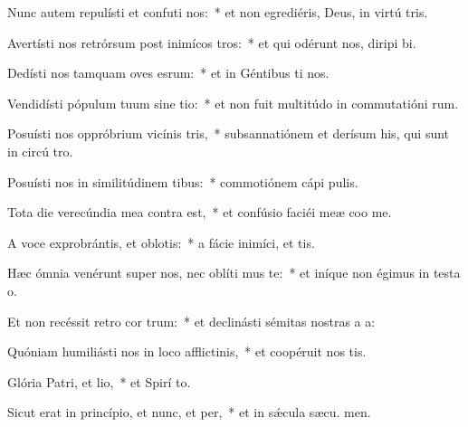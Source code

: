 \item Nunc autem repulísti et confuti nos:~* et non egrediéris, Deus, in virtú tris.
\item Avertísti nos retrórsum post inimícos tros:~* et qui odérunt nos, diripi bi.
\item Dedísti nos tamquam oves esrum:~* et in Géntibus ti nos.
\item Vendidísti pópulum tuum sine tio:~* et non fuit multitúdo in commutatióni rum.
\item Posuísti nos oppróbrium vicínis tris,~* subsannatiónem et derísum his, qui sunt in circú tro.
\item Posuísti nos in similitúdinem tibus:~* commotiónem cápi  pulis.
\item Tota die verecúndia mea contra  est,~* et confúsio faciéi meæ coo me.
\item A voce exprobrántis, et oblotis:~* a fácie inimíci, et tis.
\item Hæc ómnia venérunt super nos, nec oblíti mus te:~* et iníque non égimus in testa o.
\item Et non recéssit retro cor trum:~* et declinásti sémitas nostras a  a:
\item Quóniam humiliásti nos in loco afflictinis,~* et coopéruit nos  tis.
\item Glória Patri, et lio,~* et Spirí to.
\item Sicut erat in princípio, et nunc, et per,~* et in sǽcula sæcu. men.

